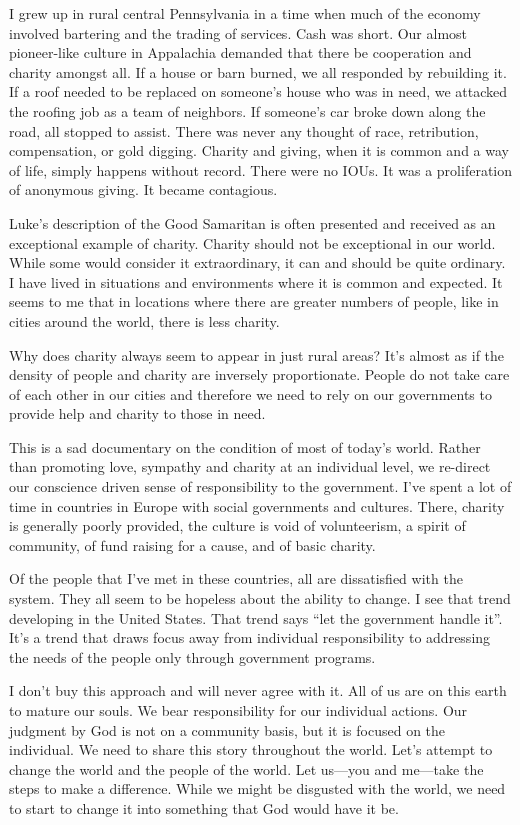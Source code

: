 \documentclass[12pt]{memoir}
\begin{document}
I grew up in rural central Pennsylvania in a time when much of the economy involved bartering and the trading of services. Cash was short. Our almost pioneer-like culture in Appalachia demanded that there be cooperation and charity amongst all. If a house or barn burned, we all responded by rebuilding it. If a roof needed to be replaced on someone's house who was in need, we attacked the roofing job as a team of neighbors. If someone's car broke down along the road, all stopped to assist. There was never any thought of race, retribution, compensation, or gold digging. Charity and giving, when it is common and a way of life, simply happens without record. There were no \textsc{IOU}s. It was a proliferation of anonymous giving. It became contagious.

Luke's description of the Good Samaritan is often presented and received as an exceptional example of charity. Charity should not be exceptional in our world. While some would consider it extraordinary, it can and should be quite ordinary. I have lived in situations and environments where it is common and expected. It seems to me that in locations where there are greater numbers of people, like in cities around the world, there is less charity.

Why does charity always seem to appear in just rural areas? It's almost as if the density of people and charity are inversely proportionate. People do not take care of each other in our cities and therefore we need to rely on our governments to provide help and charity to those in need. 

This is a sad documentary on the condition of most of today's world. Rather than promoting love, sympathy and charity at an individual level, we re-direct our conscience driven sense of responsibility to the government. I've spent a lot of time in countries in Europe with social governments and cultures. There, charity is generally poorly provided, the culture is void of volunteerism, a spirit of community, of fund raising for a cause, and of basic charity.

Of the people that I've met in these countries, all are dissatisfied with the system. They all seem to be hopeless about the ability to change. I see that trend developing in the United States. That trend says ``let the government handle it''. It's a trend that draws focus away from individual responsibility to addressing the needs of the people only through government programs.

I don't buy this approach and will never agree with it. All of us are on this earth to mature our souls. We bear responsibility for our individual actions. Our judgment by God is not on a community basis, but it is focused on the individual. We need to share this story throughout the world. Let's attempt to change the world and the people of the world. Let us---you and me---take the steps to make a difference. While we might be disgusted with the world, we need to start to change it into something that God would have it be.
\end{document}
